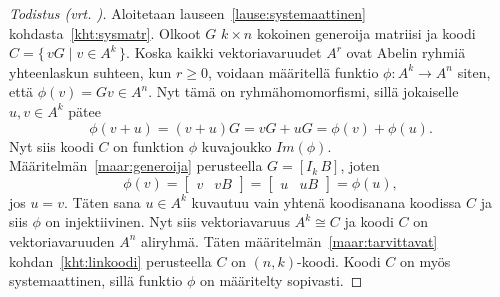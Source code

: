 \documentclass[a4paper,12pt,leqno,oneside]{report} %
\theoremstyle{plain}
\theoremstyle{definition}
\theoremstyle{remark}
\numberwithin{equation}{chapter}
\begin{document}
    \begin{proof}[Todistus \upshape(vrt. {\cite[s.~498]{PA}})]\label{tod:systemaattinen}
        Aloitetaan lauseen~\ref{lause:systemaattinen} kohdasta~\ref{kht:sysmatr}. Olkoot $G$ $k \times n$ kokoinen generoija matriisi ja koodi $C = \{\, vG \mid v \in A^k\,\}$. Koska kaikki vektoriavaruudet $A^r$ ovat Abelin ryhmiä yhteenlaskun suhteen, kun $r \ge 0$, voidaan määritellä funktio $\phi: A^k \rightarrow A^n$ siten, että $\phi(v) = Gv \in A^n$. Nyt tämä on ryhmähomomorfismi, sillä jokaiselle $u, v \in A^k$ pätee
        \[
            \phi(v + u) = (v + u)G = vG + uG = \phi(v) + \phi(u).
        \]
        Nyt siis koodi $C$ on funktion $\phi$ kuvajoukko $Im(\phi)$. Määritelmän~\ref{maar:generoija} perusteella $G = [I_k\, B]$, joten
        \[
            \phi(v) =
            \begin{bmatrix}
                v & vB
            \end{bmatrix}
            =
            \begin{bmatrix}
                u & uB
            \end{bmatrix}
            = \phi(u),
        \]
        jos $u = v$. Täten sana $u \in A^k$ kuvautuu vain yhtenä koodisanana koodissa $C$ ja siis $\phi$ on injektiivinen. Nyt siis vektoriavaruus $A^k \cong C$ ja koodi $C$ on vektoriavaruuden $A^n$ aliryhmä. Täten määritelmän~\ref{maar:tarvittavat} kohdan~\ref{kht:linkoodi} perusteella $C$ on $(n, k)$-koodi. Koodi $C$ on myös systemaattinen, sillä funktio $\phi$ on määritelty sopivasti.


\end{proof}
\end{document}
